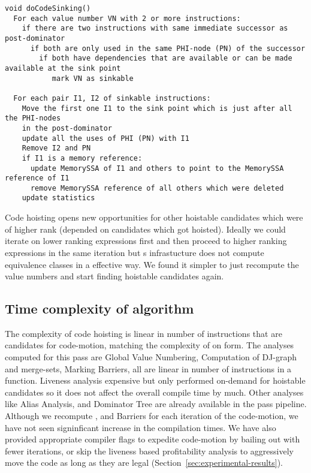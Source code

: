 \documentclass[acmlarge,review,anonymous]{acmart}\settopmatter{printfolios=true}
\begin{document}
\begin{verbatim}
void doCodeSinking()
  For each value number VN with 2 or more instructions:
    if there are two instructions with same immediate successor as post-dominator
      if both are only used in the same PHI-node (PN) of the successor
        if both have dependencies that are available or can be made available at the sink point
           mark VN as sinkable

  For each pair I1, I2 of sinkable instructions:
    Move the first one I1 to the sink point which is just after all the PHI-nodes
    in the post-dominator
    update all the uses of PHI (PN) with I1
    Remove I2 and PN
    if I1 is a memory reference:
      update MemorySSA of I1 and others to point to the MemorySSA reference of I1
      remove MemorySSA reference of all others which were deleted
    update statistics

\end{verbatim}

Code hoisting opens new opportunities for other hoistable candidates which were
of higher rank (depended on candidates which got hoisted). Ideally we could
iterate on lower ranking expressions first and then proceed to higher ranking
expressions in the same iteration but s \GVN{} infrastucture does not
compute equivalence classes in a effective way. We found it simpler to just
recompute the value numbers and start finding hoistable candidates again.

\subsection{Time complexity of algorithm}
The complexity of code hoisting is linear in number of instructions that are
candidates for code-motion, matching the complexity of \PRE{} on \SSA{} form.
The analyses computed for this pass are Global Value Numbering, Computation of
DJ-graph and merge-sets, Marking Barriers, all are linear in number of
instructions in a function. Liveness analysis expensive but only performed
on-demand for hoistable candidates so it does not affect the overall compile
time by much. Other analyses like Alias Analysis, \MemorySSA{} and Dominator Tree
are already available in the \LLVM{} pass pipeline. Although we recompute \GVN{}, and
Barriers for each iteration of the code-motion, we have not seen signinficant
increase in the compilation times. We have also provided appropriate compiler
flags to expedite code-motion by bailing out with fewer iterations, or skip the
liveness based profitability analysis to aggressively move the code as long as
they are legal (Section~\ref{sec:experimental-results}).
\end{document}
